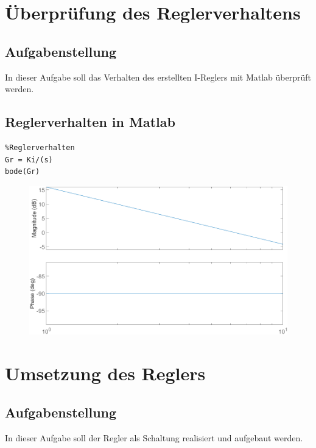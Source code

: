 \documentclass[twoside]{article}
\begin{document}
\section{Überprüfung des Reglerverhaltens}
\subsection{Aufgabenstellung}
In dieser Aufgabe soll das Verhalten des erstellten I-Reglers mit Matlab überprüft werden.

\subsection{Reglerverhalten in Matlab}
\begin{verbatim}
%Reglerverhalten
Gr = Ki/(s)
bode(Gr)
\end{verbatim}
\begin{figure}[h]
    \centering
    \includegraphics[width=1\linewidth]{img/Bode_06.png}
\end{figure}

\newpage
\section{Umsetzung des Reglers}
\subsection{Aufgabenstellung}
In dieser Aufgabe soll der Regler als Schaltung realisiert und aufgebaut werden.
\end{document}
